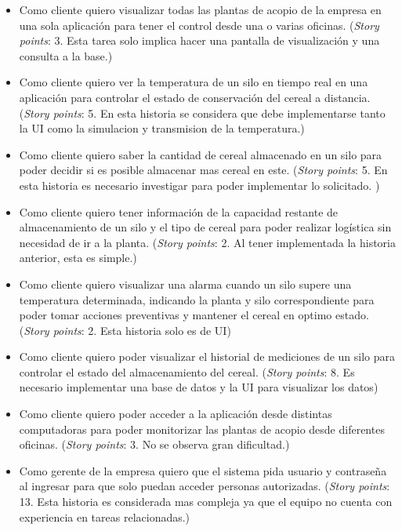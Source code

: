 \documentclass[
11pt, %
]{charter}
\begin{document}
\begin{itemize}
\item Como cliente quiero visualizar todas las plantas de acopio de la empresa en una sola aplicación para tener el control desde una o varias oficinas. (\textit{Story points}: 3.  Esta tarea solo implica hacer una pantalla de visualización y una consulta a la base.)

\item Como cliente quiero ver la temperatura de un silo en tiempo real en una aplicación para controlar el estado de conservación del cereal a distancia. (\textit{Story points}: 5. En esta historia se considera que debe implementarse tanto la UI como la simulacion y transmision de la temperatura.)

\item Como cliente quiero saber la cantidad de cereal almacenado en un silo para poder decidir si es posible almacenar mas cereal en este.  (\textit{Story points}: 5. En esta historia es necesario investigar para poder implementar lo solicitado. )

\item Como cliente quiero tener información de la capacidad restante de almacenamiento de un silo y el tipo de cereal para poder realizar logística sin necesidad de ir a la planta. (\textit{Story points}: 2. Al tener implementada la historia anterior, esta es simple.)

\item Como cliente quiero visualizar una alarma cuando un silo supere una temperatura determinada, indicando la planta y silo correspondiente para poder tomar acciones preventivas y mantener el cereal en optimo estado. (\textit{Story points}: 2. Esta historia solo es de UI)

\item Como cliente quiero poder visualizar el historial de mediciones de un silo para controlar el estado del almacenamiento del cereal. (\textit{Story points}: 8. Es necesario implementar una base de datos y la UI para visualizar los datos)

\item Como cliente quiero poder acceder a la aplicación desde distintas computadoras para poder monitorizar las plantas de acopio desde diferentes oficinas. (\textit{Story points}: 3. No se observa gran dificultad.)

\item Como gerente de la empresa quiero que el sistema pida usuario y contraseña al ingresar para que solo puedan acceder personas autorizadas. (\textit{Story points}: 13. Esta historia es considerada mas compleja ya que el equipo no cuenta con experiencia en tareas relacionadas.)
\end{itemize}
\end{document}
